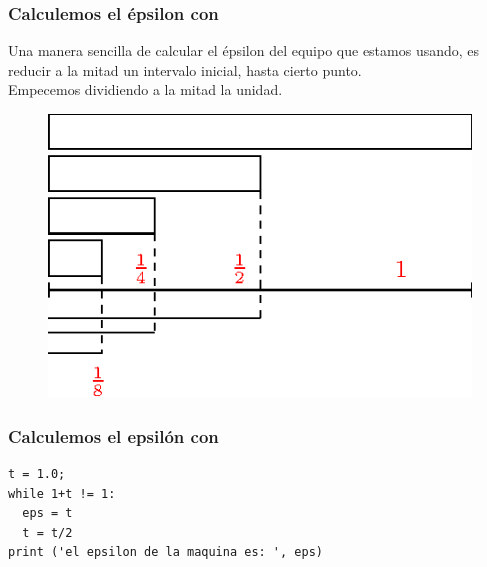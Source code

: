 \begin{frame}[fragile]
\frametitle{Calculemos el épsilon con \python}
Una manera sencilla de calcular el épsilon del equipo que estamos usando, es reducir a la mitad un intervalo inicial, hasta cierto punto.
\\
\bigskip
\pause
Empecemos dividiendo a la mitad la unidad.
\begin{figure}
\centering
\includegraphics[scale=1]{epsilonmaquina_02.eps}
\end{figure}
\end{frame}
\begin{frame}[fragile]
\frametitle{Calculemos el epsilón con \python}
\begin{lstlisting}[caption=Código para el épsilon, basicstyle=\linespread{1.2}\ttfamily\small, columns=fullflexible]
t = 1.0;
while 1+t != 1:
  eps = t
  t = t/2
print ('el epsilon de la maquina es: ', eps)
\end{lstlisting}
\end{frame}

